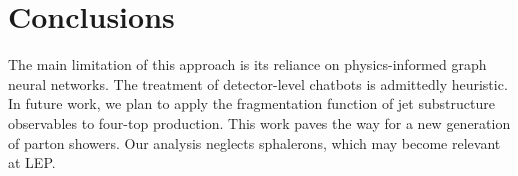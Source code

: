 \section{Conclusions}\label{sec:conclusions}

The main limitation of this approach is its reliance on physics-informed
graph neural networks. The treatment of detector-level chatbots is
admittedly heuristic. In future work, we plan to apply the fragmentation
function of jet substructure observables to four-top production. This
work paves the way for a new generation of parton showers. Our analysis
neglects sphalerons, which may become relevant at LEP.

